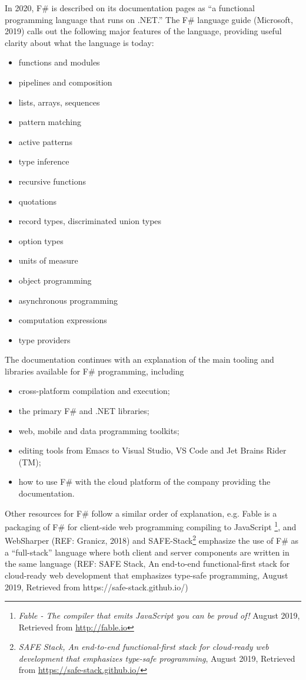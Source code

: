 \documentclass[acmsmall,review]{acmart}\settopmatter{printfolios=true,printccs=false,printacmref=false}
\begin{document}
In 2020, F\# is described on its documentation pages as “a functional programming language that runs on .NET.” The F\# language guide (Microsoft, 2019) calls out the following major features of the language, providing useful clarity about what the language is today:
\begin{itemize}
\item functions and modules
\item pipelines and composition
\item lists, arrays, sequences
\item pattern matching 
\item active patterns 
\item type inference
\item recursive functions
\item quotations
\item record types, discriminated union types
\item option types
\item units of measure
\item object programming
\item asynchronous programming
\item computation expressions
\item type providers
\end{itemize}
The documentation continues with an explanation of the main tooling and libraries available for F\# programming, including
\begin{itemize}
\item cross-platform compilation and execution;
\item the primary F\# and .NET libraries;
\item web, mobile and data programming toolkits;
\item editing tools from Emacs to Visual Studio, VS Code and Jet Brains Rider (TM);
\item how to use F\# with the cloud platform of the company providing the documentation.
\end{itemize}
Other resources for F\# follow a similar order of explanation, e.g. Fable  is a packaging of F\# for client-side web programming compiling to JavaScript \footnote{ \textit{Fable - The compiler that emits JavaScript you can be proud of!} August 2019, Retrieved from \url{http://fable.io}}, and WebSharper (REF: Granicz, 2018) and SAFE-Stack\footnote{\textit{SAFE Stack, An end-to-end functional-first stack for cloud-ready web development that emphasizes type-safe programming}, August 2019,  Retrieved from \url{https://safe-stack.github.io/}} emphasize the use of F\# as a “full-stack” language where both client and server components are written in the same language (REF: SAFE Stack, An end-to-end functional-first stack for cloud-ready web development that emphasizes type-safe programming, August 2019,  Retrieved from https://safe-stack.github.io/)
\end{document}
